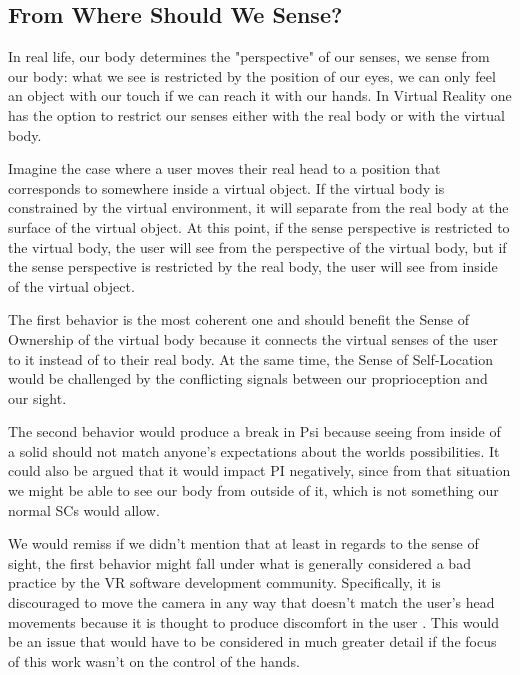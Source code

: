 \subsection{From Where Should We Sense?}
\label{subsec:sensePerspective}

In real life, our body determines the "perspective" of our senses, we sense from our body: what we see is restricted by the position of our eyes, we can only feel an object with our touch if we can reach it with our hands. In Virtual Reality one has the option to restrict our senses either with the real body or with the virtual body. 

Imagine the case where a user moves their real head to a position that corresponds to somewhere inside a virtual object. If the virtual body is constrained by the virtual environment, it will separate from the real body at the surface of the virtual object. At this point, if the sense perspective is restricted to the virtual body, the user will see from the perspective of the virtual body, but if the sense perspective is restricted by the real body, the user will see from inside of the virtual object. 

The first behavior is the most coherent one and should benefit the Sense of Ownership of the virtual body because it connects the virtual senses of the user to it instead of to their real body. At the same time, the Sense of Self-Location would be challenged by the conflicting signals between our proprioception and our sight.

The second behavior would produce a break in Psi because seeing from inside of a solid should not match anyone's expectations about the worlds possibilities. It could also be argued that it would impact PI negatively, since from that situation we might be able to see our body from outside of it, which is not something our normal SCs would allow.

We would remiss if we didn't mention that at least in regards to the sense of sight, the first behavior might fall under what is generally considered a bad practice by the VR software development community. Specifically, it is discouraged to move the camera in any way that doesn't match the user's head movements because it is thought to produce discomfort in the user \parencite{UnityCamera, OculusCamera}. This would be an issue that would have to be considered in much greater detail if the focus of this work wasn't on the control of the hands.



